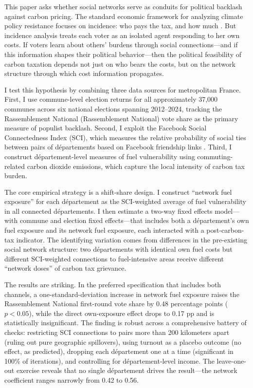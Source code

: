 \documentclass[12pt]{article}
\newcommand{\rn}{Rassemblement National}
\newcommand{\dept}{d\'{e}partement}
\newcommand{\depts}{d\'{e}partements}
\begin{document}
This paper asks whether social networks serve as conduits for political backlash against carbon pricing. The standard economic framework for analyzing climate policy resistance focuses on incidence: who pays the tax, and how much \citep{klenert2018carbon, metcalf2019distributional, bureau2019distributional}. But incidence analysis treats each voter as an isolated agent responding to her own costs. If voters learn about others' burdens through social connections---and if this information shapes their political behavior---then the political feasibility of carbon taxation depends not just on who bears the costs, but on the network structure through which cost information propagates.

I test this hypothesis by combining three data sources for metropolitan France. First, I use commune-level election returns for all approximately 37,000 communes across six national elections spanning 2012--2024, tracking the \rn{} (\rn{}) vote share as the primary measure of populist backlash. Second, I exploit the Facebook Social Connectedness Index (SCI), which measures the relative probability of social ties between pairs of \depts{} based on Facebook friendship links \citep{bailey2018social, bailey2020social}. Third, I construct \dept{}-level measures of fuel vulnerability using commuting-related carbon dioxide emissions, which capture the local intensity of carbon tax burden.

The core empirical strategy is a shift-share design. I construct ``network fuel exposure'' for each \dept{} as the SCI-weighted average of fuel vulnerability in all connected \depts{}. I then estimate a two-way fixed effects model---with commune and election fixed effects---that includes both a \dept{}'s own fuel exposure and its network fuel exposure, each interacted with a post-carbon-tax indicator. The identifying variation comes from differences in the pre-existing social network structure: two \depts{} with identical own fuel costs but different SCI-weighted connections to fuel-intensive areas receive different ``network doses'' of carbon tax grievance.

The results are striking. In the preferred specification that includes both channels, a one-standard-deviation increase in network fuel exposure raises the \rn{} first-round vote share by 0.48 percentage points ($p < 0.05$), while the direct own-exposure effect drops to 0.17 pp and is statistically insignificant. The finding is robust across a comprehensive battery of checks: restricting SCI connections to pairs more than 200 kilometers apart (ruling out pure geographic spillovers), using turnout as a placebo outcome (no effect, as predicted), dropping each \dept{} one at a time (significant in 100\% of iterations), and controlling for \dept{}-level income. The leave-one-out exercise reveals that no single \dept{} drives the result---the network coefficient ranges narrowly from 0.42 to 0.56.
\end{document}
